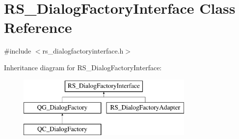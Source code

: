 \hypertarget{classRS__DialogFactoryInterface}{\section{R\-S\-\_\-\-Dialog\-Factory\-Interface Class Reference}
\label{classRS__DialogFactoryInterface}
}


{\ttfamily \#include $<$rs\-\_\-dialogfactoryinterface.\-h$>$}

Inheritance diagram for R\-S\-\_\-\-Dialog\-Factory\-Interface\-:\begin{figure}[H]
\begin{center}
\leavevmode
\includegraphics[height=3.000000cm]{classRS__DialogFactoryInterface}
\end{center}
\end{figure}
